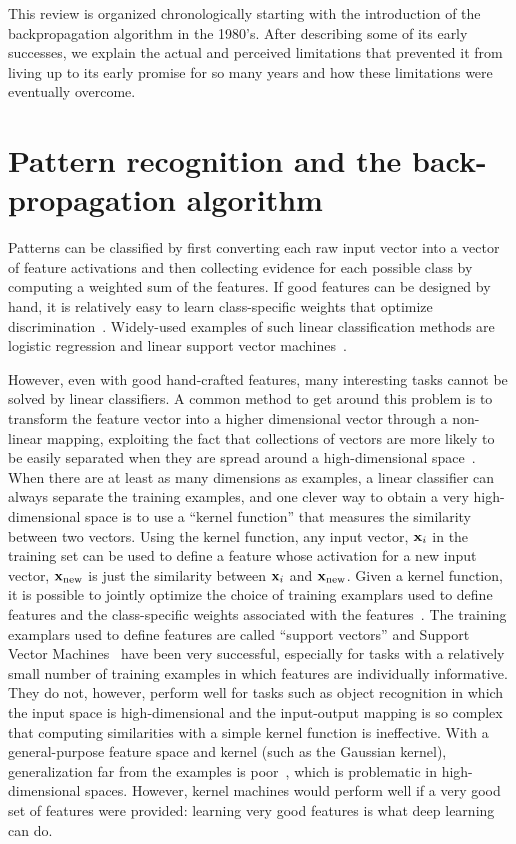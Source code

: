 \documentclass[10pts]{article}
\begin{document}
This review is organized chronologically starting with the introduction of
the backpropagation algorithm in the 1980's. After describing some of its
early successes, we explain the actual and perceived limitations that
prevented it from living up to its early promise for so many years and how
these limitations were eventually overcome.

\section{Pattern recognition and the back-propagation algorithm}

Patterns can be classified by first converting each raw input vector into a
vector of feature activations and then collecting evidence for each
possible class by computing a weighted sum of the features. If good
features can be designed by hand, it is relatively easy to learn
class-specific weights that optimize
discrimination~\citep{Rosenblatt57}. Widely-used examples of such linear
classification methods are logistic regression and linear support vector
machines~\citep{bishop-book95,Boser92}.

However, even with good hand-crafted features, many interesting tasks
cannot be solved by linear classifiers. A common method to get around this
problem is to transform the feature vector into a higher dimensional vector
through a non-linear mapping, exploiting the fact that collections of
vectors are more likely to be easily separated when they are spread around
a high-dimensional space~\citep{Cover65}. When there are at least
as many dimensions as examples, a linear classifier can always separate the
training examples, and one clever way to obtain a very high-dimensional space is to use a
``kernel function'' that measures the similarity between two vectors.
Using the kernel function, any input vector, ${\bf x}_i$ in the training
set can be used to define a feature whose activation for a new input
vector, ${\bf x}_{\rm new}$ is just the similarity between ${\bf x}_i$ and
${\bf x}_{\rm new}$. Given a kernel function, it is possible to jointly
optimize the choice of training examplars used to define features and the
class-specific weights associated with the features~\citep{Boser92}. The training
examplars used to define features are called ``support vectors'' and Support
Vector Machines~\citep{Boser92} have been very successful, especially for
tasks with a relatively small number of training examples in which features
are individually informative. They do not, however, perform well for tasks
such as object recognition in which the input space is high-dimensional and
the input-output mapping is so complex that computing similarities with a
simple kernel function is ineffective. With a general-purpose feature space
and kernel (such as the Gaussian kernel), generalization far from the
examples is poor~\citep{Bengio-localfailure-NIPS-2006-small}, which is problematic
in high-dimensional spaces. However, kernel machines would perform well if a
very good set of features were provided: learning very good
features is what deep learning can do.
\end{document}
